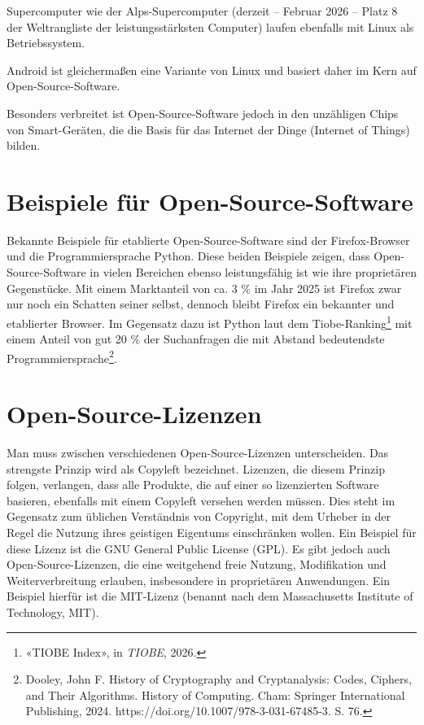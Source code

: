 \documentclass[
  nswissgerman,
  a4paper,
  DIV=11,
  numbers=noendperiod,
  ngerman]{scrreprt}
\begin{document}
Supercomputer wie der Alps-Supercomputer (derzeit -- Februar 2026 --
Platz 8 der Weltrangliste der leistungsstärksten Computer) laufen
ebenfalls mit Linux als Betriebssystem.

Android ist gleichermaßen eine Variante von Linux und basiert daher im
Kern auf Open-Source-Software.

Besonders verbreitet ist Open-Source-Software jedoch in den unzähligen
Chips von Smart-Geräten, die die Basis für das Internet der Dinge
(Internet of Things) bilden.

\section{Beispiele für
Open-Source-Software}\label{beispiele-fuxfcr-open-source-software}

Bekannte Beispiele für etablierte Open-Source-Software sind der
Firefox-Browser und die Programmiersprache Python. Diese beiden
Beispiele zeigen, dass Open-Source-Software in vielen Bereichen ebenso
leistungsfähig ist wie ihre proprietären Gegenstücke. Mit einem
Marktanteil von ca. 3 \% im Jahr 2025 ist Firefox zwar nur noch ein
Schatten seiner selbst, dennoch bleibt Firefox ein bekannter und
etablierter Browser. Im Gegensatz dazu ist Python laut dem
Tiobe-Ranking\footnote{{«{TIOBE Index}»}, in \emph{TIOBE}, 2026.} mit
einem Anteil von gut 20 \% der Suchanfragen die mit Abstand bedeutendste
Programmiersprache\footnote{Dooley, John F. History of Cryptography and
  Cryptanalysis: Codes, Ciphers, and Their Algorithms. History of
  Computing. Cham: Springer International Publishing, 2024.
  https://doi.org/10.1007/978-3-031-67485-3. S. 76.}.

\section{Open-Source-Lizenzen}\label{open-source-lizenzen}

Man muss zwischen verschiedenen Open-Source-Lizenzen unterscheiden. Das
strengste Prinzip wird als Copyleft bezeichnet. Lizenzen, die diesem
Prinzip folgen, verlangen, dass alle Produkte, die auf einer so
lizenzierten Software basieren, ebenfalls mit einem Copyleft versehen
werden müssen. Dies steht im Gegensatz zum üblichen Verständnis von
Copyright, mit dem Urheber in der Regel die Nutzung ihres geistigen
Eigentums einschränken wollen. Ein Beispiel für diese Lizenz ist die GNU
General Public License (GPL). Es gibt jedoch auch Open-Source-Lizenzen,
die eine weitgehend freie Nutzung, Modifikation und Weiterverbreitung
erlauben, insbesondere in proprietären Anwendungen. Ein Beispiel hierfür
ist die MIT-Lizenz (benannt nach dem Massachusetts Institute of
Technology, MIT).
\end{document}
